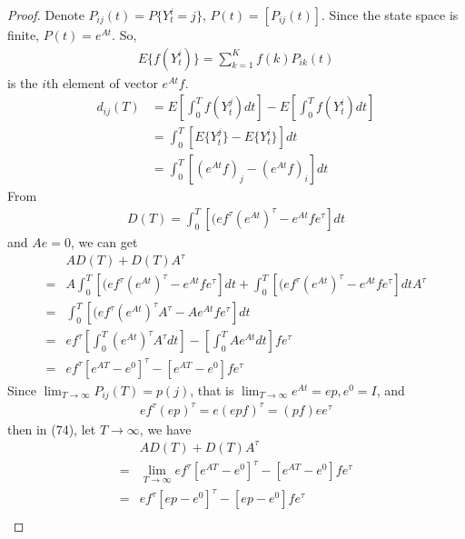 \documentclass[runningheads]{llncs}
\begin{document}
    \begin{proof}
        Denote $P_{ij}(t) = P \{ Y_t^i = j \}$, $P(t) = [P_{ij}(t)]$.
        Since the state space is finite, $P(t) = e^{At}$.
        So,
        \begin{align}
            E \{ f(Y_t^i) \} = \sum_{k=1}^K f(k) P_{ik}(t)
        \end{align}
        is the $i$th element of vector $e^{At} f$.
        \begin{align}
            d_{ij}(T) &= E [ \int_0^T f(Y_t^j)dt ] -  E [ \int_0^T f(Y_t^i)dt ] \\
            &= \int_0^T [ E\{Y_t^j\} - E\{Y_t^i\} ]dt \\
            &= \int_0^T [ (e^{At} f)_j - (e^{At} f)_i ]dt
        \end{align}
        From
        \begin{align}
            D(T) = \int_0^T [ (ef^\tau(e^{At})^\tau - e^{At}fe^\tau ]dt
        \end{align}
        and $Ae = 0$, we can get
        \begin{align}
            &AD(T) + D(T)A^\tau \\
            = &A\int_0^T [ (ef^\tau(e^{At})^\tau - e^{At}fe^\tau ]dt
            + \int_0^T [ (ef^\tau(e^{At})^\tau - e^{At}fe^\tau ]dt A^\tau \\
            = &\int_0^T [ (ef^\tau(e^{At})^\tau A^\tau - Ae^{At}fe^\tau ]dt \\
            = &ef^\tau [ \int_0^T (e^{At})^\tau A^\tau dt ] - [\int_0^T Ae^{At} dt] fe^\tau\\
            = &ef^\tau [e^{AT} - e^0]^\tau - [e^{AT} - e^0] fe^\tau
        \end{align}
        Since $\mathop{\lim}_{T \rightarrow \infty} P_{ij}(T) = p(j)$,
        that is $\mathop{\lim}_{T \rightarrow \infty} e^{At} = ep, e^0 = I$,
        and 
        \begin{align}
            ef^\tau(ep)^\tau = e(epf)^\tau = (pf)ee^\tau
        \end{align}
        then in (74), let $T \rightarrow \infty$, we have
        \begin{align}
            &AD(T) + D(T)A^\tau \\
            = &\mathop{\lim}_{T\rightarrow\infty}ef^\tau [e^{AT} - e^0]^\tau - [e^{AT} - e^0] fe^\tau \\
            = &ef^\tau [ep - e^0]^\tau - [ep - e^0] fe^\tau \\

\end{align}
\end{proof}
\end{document}
